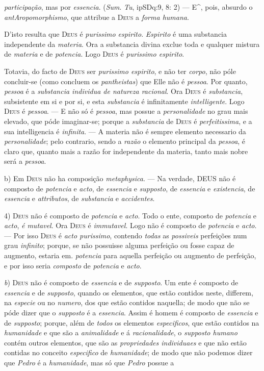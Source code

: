 \emph{participação}, mas por \emph{essencia}. (\emph{Sum}. \emph{Tu}, ipSDq:9, 8: 2) --- E\textasciicircum{}, pois, absurdo o \emph{antAropomorphismo}, que attribue a \textsc{Deus} a \emph{forma humana}.\par D'isto resulta que \textsc{Deus} é \emph{purissimo espirito}. \emph{Espirito} é uma substancia independente da \emph{materia}. Ora a substancia divina exclue toda e qualquer mistura de \emph{materia} e de \emph{potencia}. Logo \textsc{Deus} é \emph{purissimo espirito}.\par Totavia, do facto de \textsc{Deus} ser \emph{purissimo espirito}, e não ter \emph{corpo}, não póle concluir-se (como concluem os \emph{pantheistas}) que Elle não é \emph{pessoa}. Por quanto, \emph{pessoa} é a \emph{substancia individua de natureza racional}. Ora \textsc{Deus} é \emph{substancia}, subsistente em si e por si, e esta \emph{substancia} é infinitamente \emph{intelligente}. Logo \textsc{Deus} é \emph{pessoa}. --- E não só é \emph{pessoa}, mas possue a \emph{personalidade} no grau mais elevado, que póde imaginar-se; porque a \emph{substancia} de \textsc{Deus} é \emph{perfeitissima}, e a sua intelligencia é \emph{infinita}. --- A materia não é sempre elemento necessario da \emph{personalidade}; pelo contrario, sendo a \emph{razão} o elemento principal da \emph{pessoa}, é claro que, quanto mais a razão for independente da materia, tanto mais nobre será a \emph{pessoa}.\par b) Em \textsc{Deus} não ha composição \emph{metaphysica}. --- Na verdade, \textsc{DEUS} não é composto de \emph{potencia} e \emph{acto}, de \emph{essencia} e \emph{supposto}, de \emph{essencia} e \emph{existencia}, de \emph{essencia} e \emph{attributos}, de \emph{substancia} e \emph{accidentes}.\par 4) \textsc{Deus} não é composto de \emph{potencia} e \emph{acto}. Todo o ente, composto de \emph{potencia} e \emph{acto}, \emph{é mutavel}. Ora \textsc{Deus} é \emph{immutavel}. Logo não é composto de \emph{potencia} e \emph{acto}. --- Por isso \textsc{Deus} é \emph{acto purissimo}, contendo \emph{todas} as \emph{possiveis} perfeições num grau \emph{infinito}; porque, se não possuisse alguma perfeição ou fosse capaz de augmento, estaria em. \emph{potencia} para aquella perfeição ou augmento de perfeição, e por isso seria \emph{composto} de \emph{potencia} e \emph{acto}.\par \emph{b}) \textsc{Deus} não é composto de \emph{essencia} e de \emph{supposto}. Um ente é composto de \emph{essencia} e de \emph{supposto}, quando os elementos, que estão contidos neste, differem, na \emph{especie} ou no \emph{numero}, dos que estão contidos naquella; de modo que não se póde dizer que o \emph{supposto} é a \emph{essencia}. Assim é homem é composto de \emph{essencia} e de \emph{supposto}; porque, além de \emph{todos} os elementos \emph{especificos}, que estão contidos na \emph{humanidade} e que são a \emph{animalidade} e á \emph{racionalidade}, o \emph{supposto humano} contém outros elementos, que são as \emph{propriedades individuaes} e que não estão contidas no conceito \emph{especifico} de \emph{humanidade}; de modo que não podemos dizer que \emph{Pedro} é a \emph{humanidade}, mas só que \emph{Pedro} possue a 